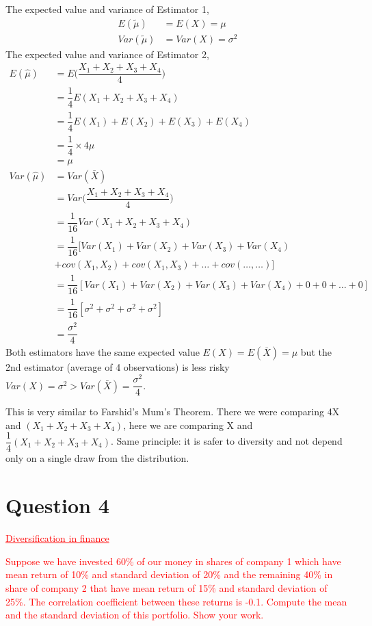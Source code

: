 \documentclass[12pt]{report}
\begin{document}
\noindent The expected value and variance of Estimator 1,
\begin{align*}
	E(\tilde{\mu}) &= E(X) = \mu \\
	Var(\tilde{\mu}) &= Var(X) = \sigma^2
\end{align*}
\noindent The expected value and variance of Estimator 2, 
\begin{align*}
E(\hat{\mu}) &= E\Big(\dfrac{X_1+X_2+X_3+X_4}{4}\Big) \\
&= \dfrac{1}{4}E(X_1+X_2+X_3+X_4) \\
&= \dfrac{1}{4} E(X_1)+E(X_2)+E(X_3)+E(X_4)\\
&= \dfrac{1}{4} \times 4\mu \\
&=\mu \\
Var(\hat{\mu}) &= Var(\bar{X}) \\
&= Var\Big(\dfrac{X_1+X_2+X_3+X_4}{4}\Big) \\
&=\dfrac{1}{16}Var(X_1+X_2+X_3+X_4) \\
&= \dfrac{1}{16}[Var(X_1)+Var(X_2)+Var(X_3)+Var(X_4) \\
&+cov(X_1,X_2)+cov(X_1,X_3)+\dots+cov(\dots,\dots)] \\
&= \dfrac{1}{16}[Var(X_1)+Var(X_2)+Var(X_3)+Var(X_4) + 0 + 0 + \dots + 0] \\
&= \dfrac{1}{16}[\sigma^2+\sigma^2+\sigma^2+\sigma^2] \\
&= \dfrac{\sigma^2}{4}
\end{align*}
\noindent Both estimators have the same expected value $E(X) = E(\bar{X}) = \mu$ but the 2nd estimator (average of 4 observations) is less risky $Var(X) = \sigma^2 > Var(\bar{X}) = \dfrac{\sigma^2}{4}$.

\noindent This is very similar to Farshid's Mum's Theorem. There we were comparing 4X and $(X_1+X_2+X_3+X_4)$, here we are comparing X and $\dfrac{1}{4}(X_1+X_2+X_3+X_4)$. Same principle: it is safer to diversity and not depend only on a single draw from the distribution.

\newpage
\section*{Question 4}
\textcolor{red}{\underline{Diversification in finance}}

\noindent \textcolor{red}{Suppose we have invested 60\% of our money in shares of company 1 which have mean return of 10\% and standard deviation of 20\% and the remaining 40\% in share of company 2 that have mean return of 15\% and standard deviation of 25\%. The correlation coefficient between these returns is -0.1. Compute the mean and the standard deviation of this portfolio. Show your work.}
\end{document}
